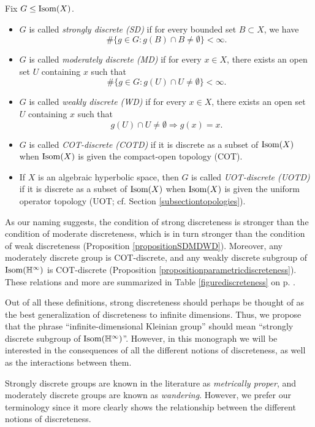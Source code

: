 \makeatletter
\def\rep@title{Definitions \ref{definitiondiscreteness} and \ref{definitionparametricdiscreteness}}
\begin{rep@definition}
Fix $G\leq\operatorname{Isom}(X)$.
\begin{itemize}
\item $G$ is called \emph{strongly discrete (SD)} if for every bounded set $B \subset X$, we have
\[
\#\{g\in G: g(B) \cap B \neq \emptyset\} < \infty.
\]
\item $G$ is called \emph{moderately discrete (MD)} if for every $x\in X$, there exists an open set $U$ containing $x$ such that
\[
\#\{g\in G: g(U) \cap U \neq \emptyset\} < \infty.
\]
\item $G$ is called \emph{weakly discrete (WD)} if for every $x\in X$, there exists an open set $U$ containing $x$ such that
\[
g(U) \cap U \neq \emptyset \Rightarrow g(x) = x.
\]
\item $G$ is called \emph{COT-discrete (COTD)} if it is discrete as a subset of $\operatorname{Isom}(X)$ when $\operatorname{Isom}(X)$ is given the compact-open topology (COT).
\item If $X$ is an algebraic hyperbolic space, then $G$ is called \emph{UOT-discrete (UOTD)} if it is discrete as a subset of $\operatorname{Isom}(X)$ when $\operatorname{Isom}(X)$ is given the uniform operator topology (UOT; cf. Section \ref{subsectiontopologies}).
\end{itemize}
\end{rep@definition}\makeatother

As our naming suggests, the condition of strong discreteness is stronger than the condition of moderate discreteness, which is in turn stronger than the condition of weak discreteness (Proposition \ref{propositionSDMDWD}). Moreover, any moderately discrete group is COT-discrete, and any weakly discrete subgroup of $\Isom(\H^\infty)$ is COT-discrete (Proposition \ref{propositionparametricdiscreteness}). These relations and more are summarized in Table \ref{figurediscreteness} on p. \pageref{figurediscreteness}.

Out of all these definitions, strong discreteness should perhaps be thought of as the best generalization of discreteness to infinite dimensions. Thus, we propose that the phrase ``infinite-dimensional Kleinian group'' should mean ``strongly discrete subgroup of $\Isom(\H^\infty)$''. However, in this monograph we will be interested in the consequences of all the different notions of discreteness, as well as the interactions between them.

\begin{remark}
Strongly discrete groups are known in the literature as \emph{metrically proper}, and moderately discrete groups are known as \emph{wandering}. However, we prefer our terminology since it more clearly shows the relationship between the different notions of discreteness.
\end{remark}


